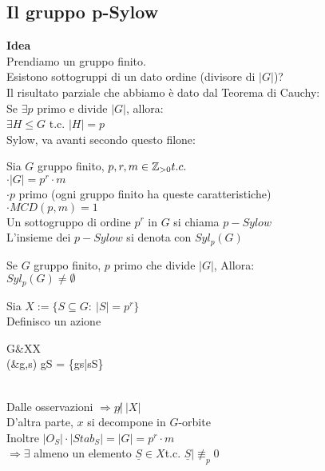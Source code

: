 \documentclass[12px]{article}
\begin{document}
{	\subsection{Il gruppo p-Sylow}
	\textbf{Idea}\\
	Prendiamo un gruppo finito.\\
	Esistono sottogruppi di un dato ordine (divisore di $|G|$)?\\
	Il risultato parziale che abbiamo è dato dal Teorema di Cauchy:\\
	Se  $\exists p$ primo e divide  $|G|$, allora:\\
	 $\exists H\leq G$ t.c. $|H| = p$ \\
	 Sylow, va avanti secondo questo filone:\\\newpage
	 \begin{defi}
		 Sia $G$ gruppo finito, $p,r,m\in\mathbb{Z}_{>0} t.c.$\\
		  $\cdot |G| = p^r\cdot m$\\
		   $\cdot p$ primo \hfill (ogni gruppo finito ha queste caratteristiche)\\
		   $\cdot MCD(p,m) = 1$\\
	 Un sottogruppo di ordine $p^r$ in $G$ si chiama $p-Sylow$\\
	 L'insieme dei  $p-Sylow$ si denota con $Syl_p(G)$\\
	 \end{defi}
	 \begin{teo}
	 	Se $G$ gruppo finito, $p$ primo che divide $|G|$, Allora:\\
		 $Syl_p(G)\neq \emptyset$
	 \end{teo}
	 \begin{dimo}
		 Sia $X:= \{S\subseteq G:\ |S| = p^r\}$\\
		 Definisco un azione\\
		  \begin{aligned}
			  G&\times X\rightarrow X\\
			  (&g,s) \rightarrow gS = \{gs|s\in S\}
		 \end{aligned}\\
		 Dalle osservazioni $ \Rightarrow p \not | \ |X|$ \\
		 D'altra parte, $x$ si decompone in $G$-orbite\\
		 Inoltre $|O_S|\cdot|Stab_S| = |G| = p^r\cdot m$\\
		  $ \Rightarrow \exists$ almeno un elemento $\underline S\in X$t.c.  $\underline S|\not\equiv_p 0$\\

\end{dimo}}
\end{document}
